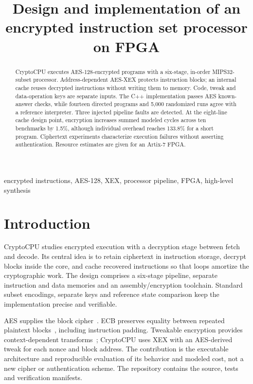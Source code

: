 \documentclass[conference,a4paper]{IEEEtran}
\begin{document}
\title{Design and implementation of an encrypted instruction set processor on FPGA}
\author{
}
\maketitle

\begin{abstract}
CryptoCPU executes AES-128-encrypted programs with a six-stage, in-order
MIPS32-subset processor. Address-dependent AES-XEX protects instruction blocks;
an internal cache reuses decrypted instructions without writing them to memory.
Code, tweak and data-operation keys are separate inputs. The C++ implementation
passes AES known-answer checks, while fourteen directed programs and 5,000
randomized runs agree with a reference interpreter. Three injected pipeline
faults are detected. At the eight-line cache design point, encryption increases
summed modeled cycles across ten benchmarks by 1.5\%, although individual
overhead reaches 133.8\% for a short program. Ciphertext experiments characterize
execution failures without asserting authentication. Resource estimates are
given for an Artix-7 FPGA.
\end{abstract}

\begin{IEEEkeywords}
encrypted instructions, AES-128, XEX, processor pipeline, FPGA, high-level synthesis
\end{IEEEkeywords}

\section{Introduction}
CryptoCPU studies encrypted execution with a decryption stage between fetch
and decode. Its central idea is to retain ciphertext in instruction storage, decrypt blocks inside the core,
and cache recovered instructions so that loops amortize the cryptographic work.
The design comprises a six-stage pipeline, separate instruction and data
memories and an assembly/encryption toolchain. Standard subset encodings, separate keys and reference
state comparison keep the implementation precise and verifiable.

AES supplies the block cipher~\cite{aes}. ECB preserves equality between
repeated plaintext blocks~\cite{modes}, including instruction padding.
Tweakable encryption provides context-dependent transforms~\cite{xex};
CryptoCPU uses XEX with an AES-derived tweak for each nonce and block address.
The contribution is the executable architecture and reproducible evaluation
of its behavior and modeled cost, not a new cipher or authentication scheme.
The repository contains the source, tests and verification manifests.
\end{document}
